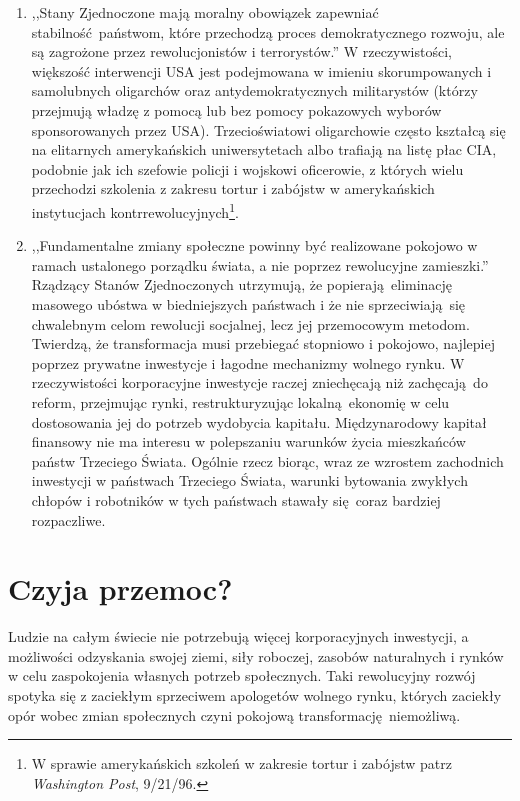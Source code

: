 \documentclass[12pt]{book}
\newcommand{\sekcja}[1]{
  \addcontentsline{toc}{section}{#1}
  \section*{#1}
}
\begin{document}
\begin{enumerate}
    Jakby tego było mało, rewolucyjne rządy takie jak Kuba, Libia, Wietnam i Korea Północna były — i dalej są — chętne do prowadzenia handlu i utrzymywania pokojowych relacji z tym państwem. Te kraje nie zagrażają w żaden sposób bezpieczeństwu narodowemu Stanów Zjednoczonych i ich mieszkańców, lecz zagranicznym interesom globalnego kapitalizmu. Gdyby pozwolono na rozmnożenie się państw z alternatywnym systemem socjalistycznym, który wykorzystuje ziemię, pracę, kapitał i zasoby naturalne w sposób kolektywistyczny, z czasem podważyłby on globalny system kapitalistyczny.
  \item ,,Stany Zjednoczone mają moralny obowiązek zapewniać stabilność państwom, które przechodzą proces demokratycznego rozwoju, ale są zagrożone przez rewolucjonistów i terrorystów.'' W rzeczywistości, większość interwencji USA jest podejmowana w imieniu skorumpowanych i samolubnych oligarchów oraz antydemokratycznych militarystów (którzy przejmują władzę z pomocą lub bez pomocy pokazowych wyborów sponsorowanych przez USA). Trzecioświatowi oligarchowie często kształcą się na elitarnych amerykańskich uniwersytetach albo trafiają na listę płac CIA, podobnie jak ich szefowie policji i wojskowi oficerowie, z których wielu przechodzi szkolenia z zakresu tortur i zabójstw w amerykańskich instytucjach kontrrewolucyjnych\footnote{W sprawie amerykańskich szkoleń w zakresie tortur i zabójstw patrz \textit{Washington Post}, 9/21/96.}.
  \item ,,Fundamentalne zmiany społeczne powinny być realizowane pokojowo w ramach ustalonego porządku świata, a nie poprzez rewolucyjne zamieszki.'' Rządzący Stanów Zjednoczonych utrzymują, że popierają eliminację masowego ubóstwa w biedniejszych państwach i że nie sprzeciwiają się chwalebnym celom rewolucji socjalnej, lecz jej przemocowym metodom. Twierdzą, że transformacja musi przebiegać stopniowo i pokojowo, najlepiej poprzez prywatne inwestycje i łagodne mechanizmy wolnego rynku. W rzeczywistości korporacyjne inwestycje raczej zniechęcają niż zachęcają do reform, przejmując rynki, restrukturyzując lokalną ekonomię w celu dostosowania jej do potrzeb wydobycia kapitału. Międzynarodowy kapitał finansowy nie ma interesu w polepszaniu warunków życia mieszkańców państw Trzeciego Świata. Ogólnie rzecz biorąc, wraz ze wzrostem zachodnich inwestycji w państwach Trzeciego Świata, warunki bytowania zwykłych chłopów i robotników w tych państwach stawały się coraz bardziej rozpaczliwe.
\end{enumerate}


\sekcja{Czyja przemoc?}
Ludzie na całym świecie nie potrzebują więcej korporacyjnych inwestycji, a możliwości odzyskania swojej ziemi, siły roboczej, zasobów naturalnych i rynków w celu zaspokojenia własnych potrzeb społecznych. Taki rewolucyjny rozwój spotyka się z zaciekłym sprzeciwem apologetów wolnego rynku, których zaciekły opór wobec zmian społecznych czyni pokojową transformację niemożliwą.
\end{document}
